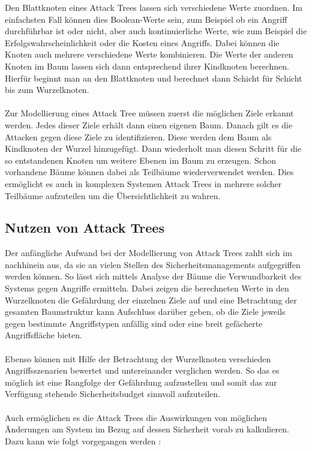 Den Blattknoten eines Attack Trees lassen sich verschiedene Werte zuordnen. Im einfachsten Fall können dies Boolean-Werte sein, zum Beispiel ob ein Angriff durchführbar ist oder nicht, aber auch kontinuierliche Werte, wie zum Beispiel die Erfolgswahrscheinlichkeit oder die Kosten eines Angriffs. Dabei können die Knoten auch mehrere verschiedene Werte kombinieren. Die Werte der anderen Knoten im Baum lassen sich dann entsprechend ihrer Kindknoten berechnen. Hierfür beginnt man an den Blattknoten und berechnet dann Schicht für Schicht bis zum Wurzelknoten. \cite{schneier1999attacktree}
\\
\\
Zur Modellierung eines Attack Tree müssen zuerst die möglichen Ziele erkannt werden. Jedes dieser Ziele erhält dann einen eigenen Baum. Danach gilt es die Attacken gegen diese Ziele zu identifizieren. Diese werden dem Baum als Kindknoten der Wurzel hinzugefügt. Dann wiederholt man diesen Schritt für die so entstandenen Knoten um weitere Ebenen im Baum zu erzeugen. Schon vorhandene Bäume können dabei als Teilbäume wiederverwendet werden. Dies ermöglicht es auch in komplexen Systemen Attack Trees in mehrere solcher Teilbäume aufzuteilen um die Übersichtlichkeit zu wahren. \cite{schneier1999attacktree}

\subsection{Nutzen von Attack Trees}
Der anfängliche Aufwand bei der Modellierung von Attack Trees zahlt sich im nachhinein aus, da sie an vielen Stellen des Sicherheitsmanagements aufgegriffen werden können. So lässt sich mittels Analyse der Bäume die Verwundbarkeit des Systems gegen Angriffe ermitteln. Dabei zeigen die berechneten Werte in den Wurzelknoten die Gefährdung der einzelnen Ziele auf und eine Betrachtung der gesamten Baumstruktur kann Aufschluss darüber geben, ob die Ziele jeweils gegen bestimmte Angriffstypen anfällig sind oder eine breit gefächerte Angriffsfläche bieten. \cite{schneier1999attacktree}
\\
\\
Ebenso können mit Hilfe der Betrachtung der Wurzelknoten verschieden Angriffsszenarien  bewertet und untereinander verglichen werden. So das es möglich ist eine Rangfolge der Gefährdung aufzustellen und somit das zur Verfügung stehende Sicherheitsbudget sinnvoll aufzuteilen. \cite{schneier1999attacktree}
\\
\\
Auch ermöglichen es die Attack Trees die Auswirkungen von möglichen Änderungen am System im Bezug auf dessen Sicherheit vorab zu kalkulieren.  Dazu kann wie folgt vorgegangen werden \cite{schneier1999attacktree}:

